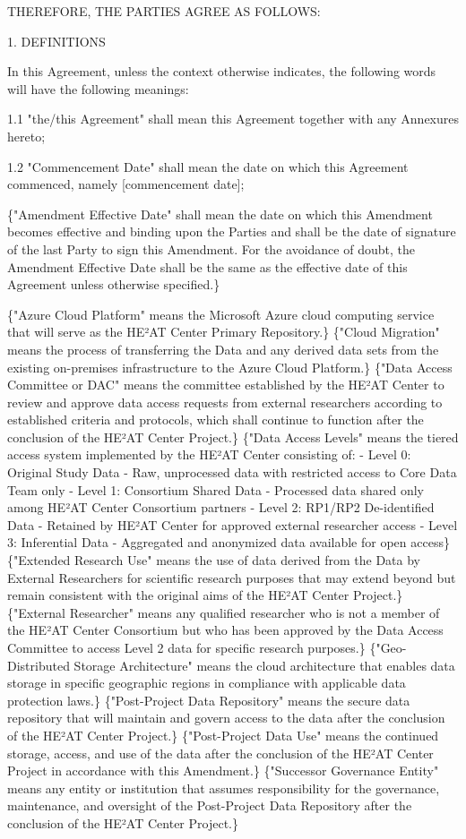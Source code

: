 \documentclass[12pt,letterpaper]{article}
\newcommand{\added}[1]{\textcolor{addcolor}{#1}}
\begin{document}
THEREFORE, THE PARTIES AGREE AS FOLLOWS:

1.	DEFINITIONS

    In this Agreement, unless the context otherwise indicates, the following words will have the following meanings:

1.1	"the/this Agreement" shall mean this Agreement together with any Annexures hereto;

1.2	"Commencement Date" shall mean the date on which this Agreement commenced, namely [commencement date];  

\added\{"Amendment Effective Date" shall mean the date on which this Amendment becomes effective and binding upon the Parties and shall be the date of signature of the last Party to sign this Amendment. For the avoidance of doubt, the Amendment Effective Date shall be the same as the effective date of this Agreement unless otherwise specified.\}

\added\{"Azure Cloud Platform" means the Microsoft Azure cloud computing service that will serve as the HE²AT Center Primary Repository.\} \added\{"Cloud Migration" means the process of transferring the Data and any derived data sets from the existing on-premises infrastructure to the Azure Cloud Platform.\} \added\{"Data Access Committee or DAC" means the committee established by the HE²AT Center to review and approve data access requests from external researchers according to established criteria and protocols, which shall continue to function after the conclusion of the HE²AT Center Project.\} \added\{"Data Access Levels" means the tiered access system implemented by the HE²AT Center consisting of: - Level 0: Original Study Data - Raw, unprocessed data with restricted access to Core Data Team only - Level 1: Consortium Shared Data - Processed data shared only among HE²AT Center Consortium partners - Level 2: RP1/RP2 De-identified Data - Retained by HE²AT Center for approved external researcher access - Level 3: Inferential Data - Aggregated and anonymized data available for open access\} \added\{"Extended Research Use" means the use of data derived from the Data by External Researchers for scientific research purposes that may extend beyond but remain consistent with the original aims of the HE²AT Center Project.\} \added\{"External Researcher" means any qualified researcher who is not a member of the HE²AT Center Consortium but who has been approved by the Data Access Committee to access Level 2 data for specific research purposes.\} \added\{"Geo-Distributed Storage Architecture" means the cloud architecture that enables data storage in specific geographic regions in compliance with applicable data protection laws.\} \added\{"Post-Project Data Repository" means the secure data repository that will maintain and govern access to the data after the conclusion of the HE²AT Center Project.\} \added\{"Post-Project Data Use" means the continued storage, access, and use of the data after the conclusion of the HE²AT Center Project in accordance with this Amendment.\} \added\{"Successor Governance Entity" means any entity or institution that assumes responsibility for the governance, maintenance, and oversight of the Post-Project Data Repository after the conclusion of the HE²AT Center Project.\}
\end{document}
